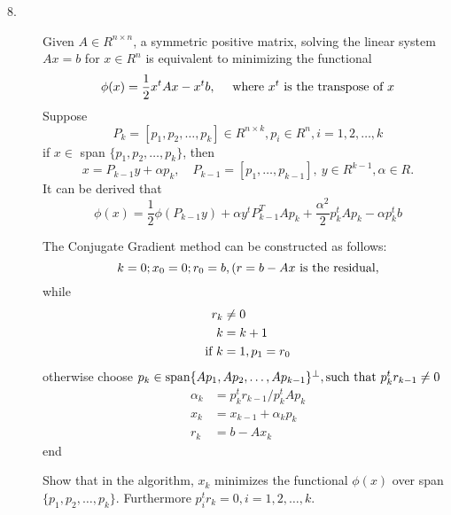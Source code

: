 \documentclass{article}
\begin{document}
\begin{description}
\item[8.]
Given $A \in R^{n \times n}$, a symmetric positive matrix, solving the linear
system $Ax = b$ for $x \in R^n$ is equivalent to minimizing the functional
$$\phi (x) = \frac{1}{2} x^t Ax - x^t b, \quad
  \hbox{\ where\ } x^t \hbox{\ is\ } \hbox{the\ } \hbox{transpose\ }
  \hbox{of\ } x$$
Suppose
$$P_k = [p_1, p_2, \dots, p_k] \in R^{n \times k}, p_i \in R^n,
  i = 1,2, \dots, k$$
if $x \in$ span $\{p_1, p_2, \dots, p_k\}$, then
$$x=P_{k-1} y + \alpha p_k, \quad P_{k-1} = [p_1, \dots, p_{k-1}], \
  y \in R^{k-1}, \alpha \in R.$$
It can be derived that
$$\phi (x) = \frac{1}{2} \phi (P_{k-1} y) + \alpha y^t P^T_{k-1} Ap_k +
  \frac{\alpha^2}{2} p^t_k Ap_k - \alpha p^t_k b$$

The Conjugate Gradient method can be constructed as follows:
$$k=0; x_0 = 0; r_0 = b, (r=b-Ax \hbox{\ is\ } \hbox{the\ }
\hbox{residual},$$
while
$$\begin{aligned}
        r_k &\neq 0 \\
        k &= k+1 \\
        \hbox{if\ } k &=1, p_1 = r_0
        \end{aligned} $$
otherwise choose
$p_k \in \hbox{span} \{Ap_1, Ap_2, \dots, Ap_{k-1} \}^\perp, \hbox{such}
  \hbox{\ that\ }  p^t_k r_{k-1} \neq 0$
$$\begin{aligned}
        \alpha_k &= p^t_k r_{k-1} / p^t_k Ap_k \\
        x_k &= x_{k-1} + \alpha_k p_k \\
        r_k &= b- Ax_k
        \end{aligned}$$
end

Show that in the algorithm, $x_k$ minimizes the functional $\phi (x)$ over
span $\{p_1, p_2, \dots, p_k\}$. Furthermore $p^t_ir_k = 0, i=1,2, \dots, k$.






\end{description}    
\end{document}
